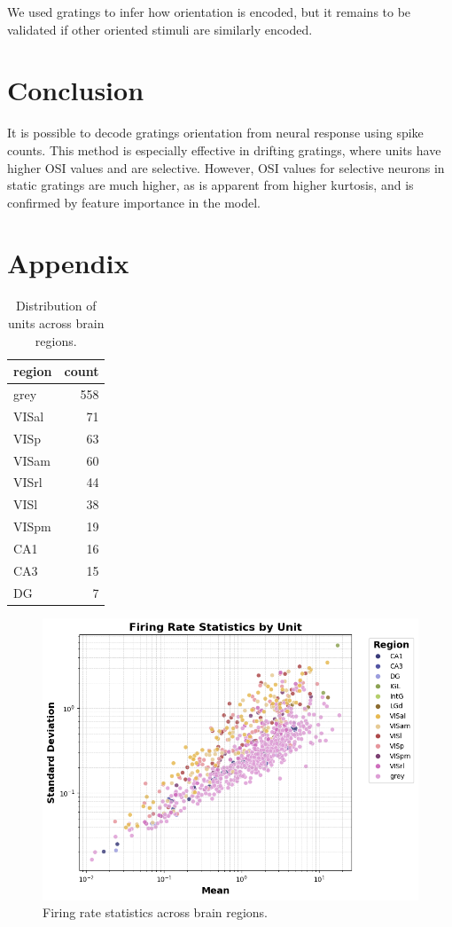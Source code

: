 \documentclass[10pt,twocolumn]{article}
\begin{document}
We used gratings to infer how orientation is encoded, but it remains to be validated if other oriented stimuli are similarly encoded.

\section{Conclusion}

It is possible to decode gratings orientation from neural response using spike counts. This method is especially effective in drifting gratings, where units have higher OSI values and are selective. However, OSI values for selective neurons in static gratings are much higher, as is apparent from higher kurtosis, and is confirmed by feature importance in the model.

\newpage

\appendix

\section{Appendix}

\begin{table}[H]
\centering
\begin{tabular}{lr}
\toprule
region & count \\
\midrule
grey   & 558 \\
VISal  &  71 \\
VISp   &  63 \\
VISam  &  60 \\
VISrl  &  44 \\
VISl   &  38 \\
VISpm  &  19 \\
CA1    &  16 \\
CA3    &  15 \\
DG     &   7 \\
\bottomrule
\end{tabular}
\caption{Distribution of units across brain regions.}
\label{tab:regions}
\end{table}

\begin{figure}[H]
\centering
\includegraphics[width=\linewidth]{report_images/unit_firing_rate_statistics.png}
\caption{Firing rate statistics across brain regions.}
\label{fig:firing_rate_stats}
\end{figure}
\end{document}
